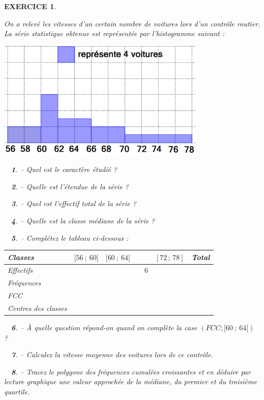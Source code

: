 \documentclass[a4paper]{article}   %
\renewcommand{\(}{\left(}
\renewcommand{\)}{\right)}
\newtheorem{ques}{~}
\newenvironment{qu}{\begin{ques}--} {\end{ques}}
\newtheorem{EXO}{\large EXERCICE }
\newenvironment{EX}   { \setcounter{ques}{0} \begin{EXO} \hrulefill ~\vspace{0.3cm}

\normalfont}    {\end{EXO} \medskip}
\begin{document}
\newpage
\begin{EX} On a relevé les vitesses d'un certain nombre de voitures lors d'un contrôle routier. La série statistique obtenue est représentée par l'histogramme suivant :
\begin{center}
\includegraphics[width=10cm]{9ex5.png}
\end{center}
\begin{qu} Quel est le caractère étudié ?
\end{qu}

\begin{qu} Quelle est l'étendue de la série ?
\end{qu}

\begin{qu} Quel est l'effectif total de la série ?
\end{qu}

\begin{qu} Quelle est la classe médiane de la série ?
\end{qu}

\begin{qu} Complétez le tableau ci-dessous :
\begin{center}
\begin{tabular}{|p{3.5cm}| p{2cm}|p{2cm}|p{2cm}|p{2cm}|p{2cm}|p{2cm}|}		
\hline							%
Classes & $[56~;~60[$&$[60~;~64[$&&&$[72\,;\,78]$&Total \\
\hline
Effectifs&&&&$6$&&\\
\hline
Fréquences&&&&&&\\
\hline
FCC&&&&&&\\
\hline
Centres des classes&&&&&&\\
\hline
\end{tabular}
\end{center}
\end{qu}

\begin{qu} \`A quelle question répond-on quand on complète la case $(FCC ; [60~;~64[)$ ?
\end{qu}

\begin{qu} Calculez la vitesse moyenne des voitures lors de ce contrôle.
\end{qu}

\begin{qu} Tracez le polygone des fréquences cumulées croissantes et en déduire par lecture graphique une valeur approchée de la médiane, du premier et du troisième quartile.
\end{qu}

\end{EX}
\end{document}
